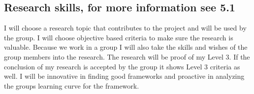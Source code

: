 \subsection{Research skills, for more information see 5.1}
I will choose a research topic that contributes to the project and will be used by the group. I will choose objective based criteria to make sure the research is valuable. Because we work in a group I will also take the skills and wishes of the group members into the research. The research will be proof of my Level 3. If the conclusion of my research is accepted by the group it shows Level 3 criteria as well. I will be innovative in finding good frameworks and proactive in analyzing the groups learning curve for the framework.
